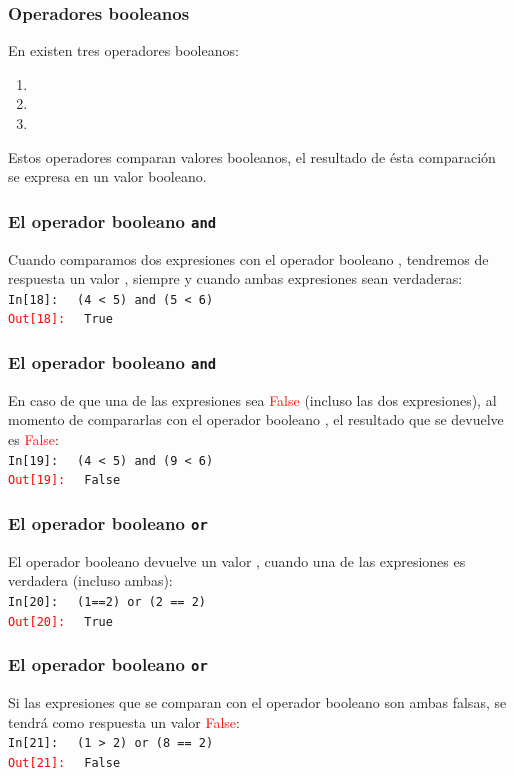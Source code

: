 \documentclass[12pt]{beamer}
\begin{document}
\begin{frame}
\frametitle{Operadores booleanos}
En \python{} existen tres operadores booleanos:
\begin{enumerate}[<+->]
\item {}
\item {}
\item {}
\end{enumerate}
\pause
Estos operadores comparan valores booleanos, el resultado de ésta comparación se expresa en un valor booleano.
\end{frame}
\begin{frame}[fragile]
\frametitle{El operador booleano \texttt{and}}
Cuando comparamos dos expresiones con el operador booleano , tendremos de respuesta un valor , siempre y cuando ambas expresiones sean verdaderas:
\\
\bigskip
\pause
\textcolor{ao}{\texttt{In[18]: }} \verb| (4 < 5) and (5 < 6)| \\
\pause
\textcolor{red}{\texttt{Out[18]: }} \verb| True|
\end{frame}
\begin{frame}[fragile]
\frametitle{El operador booleano \texttt{and}}
En caso de que una de las expresiones sea \textcolor{red}{False} (incluso las dos expresiones), al momento de compararlas con el operador booleano , el resultado que se devuelve es \textcolor{red}{False}:
\\
\bigskip
\pause
\textcolor{ao}{\texttt{In[19]: }} \verb| (4 < 5) and (9 < 6)| \\
\pause
\textcolor{red}{\texttt{Out[19]: }} \verb| False|
\end{frame}
\begin{frame}[fragile]
\frametitle{El operador booleano \texttt{or}}
El operador booleano  devuelve un valor , cuando una de las expresiones es verdadera (incluso ambas):
\\
\bigskip
\pause
\textcolor{ao}{\texttt{In[20]: }} \verb| (1==2) or (2 == 2)| \\
\pause
\textcolor{red}{\texttt{Out[20]: }} \verb| True|
\end{frame}
\begin{frame}[fragile]
\frametitle{El operador booleano \texttt{or}}
Si las expresiones que se comparan con el operador booleano  son ambas falsas, se tendrá como respuesta un valor \textcolor{red}{False}:
\\
\bigskip
\pause
\textcolor{ao}{\texttt{In[21]: }} \verb| (1 > 2) or (8 == 2)| \\
\pause
\textcolor{red}{\texttt{Out[21]: }} \verb| False|
\end{frame}
\end{document}
